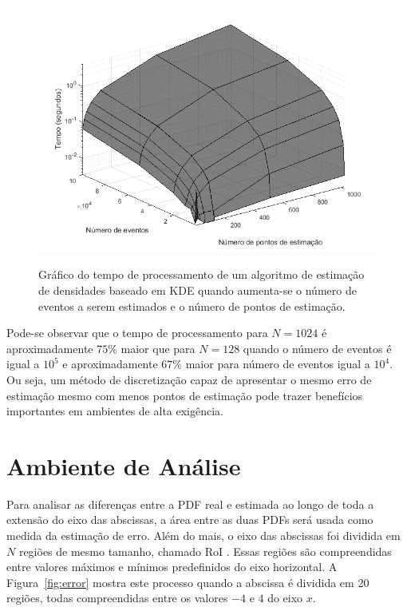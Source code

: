 \begin{figure}[!ht]
	\centering
	\includegraphics[width=0.8\linewidth]{./figuras/custocomp.png}\\
	\caption{Gráfico do tempo de processamento de um algoritmo de estimação de densidades baseado em KDE quando aumenta-se o número de eventos a serem estimados e o número de pontos de estimação.}
	\label{fig:compKDE}
\end{figure}

Pode-se observar que o tempo de processamento para $N = 1024$ é aproximadamente $75\%$ maior que para $N = 128$ quando o número de eventos é igual a $10^5$ e aproximadamente $67\%$ maior para número de eventos igual a $10^4$. Ou seja, um método de discretização capaz de apresentar o mesmo erro de estimação mesmo com menos pontos de estimação pode trazer benefícios importantes em ambientes de alta exigência.


\section{Ambiente de Análise}

Para analisar as diferenças entre a \ac{PDF} real e estimada ao longo de toda a extensão do eixo das abscissas, a área entre as duas \ac{PDF}s será usada como medida da estimação de erro. Além do mais, o eixo das abscissas foi dividida em $N$ regiões de mesmo tamanho, chamado \ac{RoI} \cite{ron1999art}. Essas regiões são compreendidas entre valores máximos e mínimos predefinidos do eixo horizontal. A Figura~\ref{fig:error} mostra este processo quando a abscissa é dividida em 20 regiões, todas compreendidas entre os valores $-4$ e $4$ do eixo $ x $.


